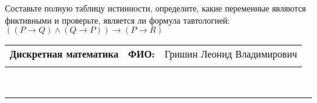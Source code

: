 \documentclass[10pt]{exam}
\newcommand{\class}{Дискретная математика}
\newcommand{\examdate}{}
\begin{document}
\begin{questions}
\begin{enumerate}[a)]
\end{enumerate}\question Составьте полную таблицу истинности, определите, какие переменные являются фиктивными и проверьте, является ли формула тавтологией:
$(( P \rightarrow Q) \land (Q \rightarrow P)) \rightarrow (P \rightarrow R)$

\end{questions}
\newpage
\begin{flushright}
\begin{tabular}{p{2.8in} r l}
\textbf{\class} & \textbf{ФИО:} &Гришин Леонид Владимирович
\\

\textbf{\examdate} &&\\
\end{tabular}\\
\end{flushright}
\rule[1ex]{\textwidth}{.1pt}
\end{document}

